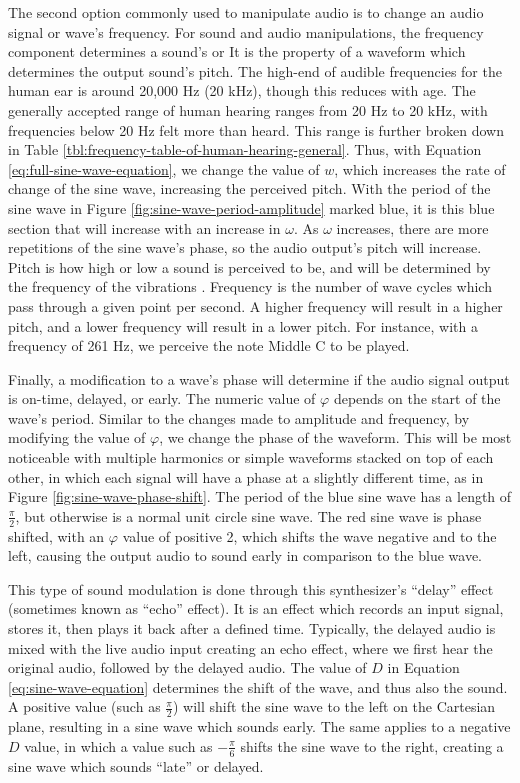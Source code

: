 The second option commonly used to manipulate audio is to change an audio signal or wave's frequency. For sound and audio manipulations, the frequency component determines a sound's  or  It is the property of a waveform which determines the output sound's pitch. The high-end of audible frequencies for the human ear is around 20,000 Hz (20 kHz), though this reduces with age. The generally accepted range of human hearing ranges from 20 Hz to 20 kHz, with frequencies below 20 Hz felt more than heard\cite{Rosen_Howell_2011}. This range is further broken down in Table \ref{tbl:frequency-table-of-human-hearing-general}. Thus, with Equation \ref{eq:full-sine-wave-equation}, we change the value of $w$, which increases the rate of change of the sine wave, increasing the perceived pitch. With the period of the sine wave in Figure \ref{fig:sine-wave-period-amplitude} marked blue, it is this blue section that will increase with an increase in $\omega$. As $\omega$ increases, there are more repetitions of the sine wave's phase, so the audio output's pitch will increase. Pitch is how high or low a sound is perceived to be, and will be determined by the frequency of the vibrations \cite{Toft_2020}. Frequency is the number of wave cycles which pass through a given point per second. A higher frequency will result in a higher pitch, and a lower frequency will result in a lower pitch. For instance, with a frequency of 261 Hz, we perceive the note Middle C to be played. 

Finally, a modification to a wave's phase will determine if the audio signal output is on-time, delayed, or early. The numeric value of $\varphi$ depends on the start of the wave's period. Similar to the changes made to amplitude and frequency, by modifying the value of $\varphi$, we change the phase of the waveform. This will be most noticeable with multiple harmonics or simple waveforms stacked on top of each other, in which each signal will have a phase at a slightly different time, as in Figure \ref{fig:sine-wave-phase-shift}. The period of the blue sine wave has a length of $\frac{\pi}{2}$, but otherwise is a normal unit circle sine wave. The red sine wave is phase shifted, with an $\varphi$ value of positive 2, which shifts the wave negative and to the left, causing the output audio to sound early in comparison to the blue wave. 

This type of sound modulation is done through this synthesizer's ``delay'' effect (sometimes known as ``echo'' effect). It is an effect which records an input signal, stores it, then plays it back after a defined time. Typically, the delayed audio is mixed with the live audio input creating an echo effect, where we first hear the original audio, followed by the delayed audio. The value of $D$ in Equation \ref{eq:sine-wave-equation} determines the shift of the wave, and thus also the sound. A positive value (such as $\frac{\pi}{2}$) will shift the sine wave to the left on the Cartesian plane, resulting in a sine wave which sounds early. The same applies to a negative $D$ value, in which a value such as $-\frac{\pi}{6}$ shifts the sine wave to the right, creating a sine wave which sounds ``late'' or delayed.

